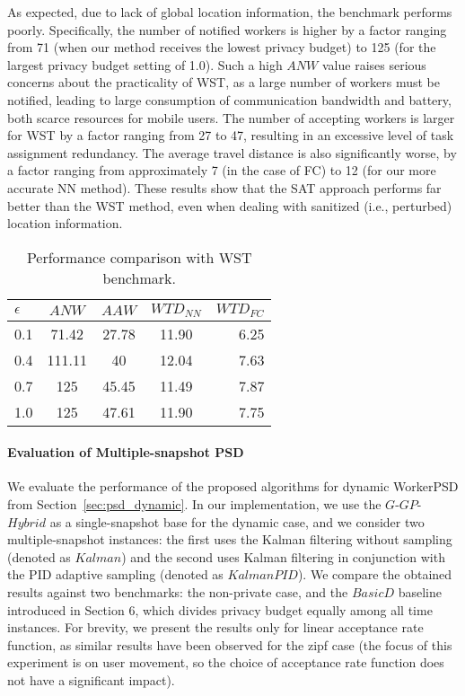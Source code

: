 \documentclass{USC-Thesis}
\newcommand{\tn}{\tabularnewline}
\numberwithin{equation}{chapter}
\begin{document}
As expected, due to lack of global location information, the benchmark performs poorly. Specifically, the number of notified workers is higher by a factor ranging from 71 (when our method receives the lowest privacy budget) to 125 (for the largest privacy budget setting of 1.0). Such a high $ANW$ value raises serious concerns about the practicality of WST, as a large number of workers must be notified, leading to large consumption of communication bandwidth and battery, both scarce resources for mobile users. The number of accepting workers is larger for WST by a factor ranging from 27 to 47, resulting in an excessive level of task assignment redundancy. The average travel distance is also significantly worse, by a factor ranging from approximately 7 (in the case of FC) to 12 (for our more accurate NN method). These results show that the SAT approach performs far better than the WST method, even when dealing with sanitized (i.e., perturbed) location information.

\begin{table}[ht]
\begin{center}
\footnotesize
\begin{tabular}{ l | c | c | c | r}
\textbf{$\epsilon$} & \textbf{$\mathit{ANW}$} & \textbf{$\mathit{AAW}$} & \textbf{$\mathit{WTD_{NN}}$} & \textbf{$\mathit{WTD_{FC}}$} \tn
\hline
0.1 & 71.42 & 27.78 & 11.90 & 6.25 \tn
\hline
0.4 & 111.11 & 40 & 12.04 & 7.63 \tn
\hline
0.7 & 125 & 45.45 & 11.49 & 7.87 \tn
\hline
1.0 & 125 & 47.61 & 11.90 & 7.75 \tn
\end{tabular}
\caption{Performance comparison with WST benchmark.}
\label{tab:privacy_wst}
\end{center}
\end{table}


\paragraph{Evaluation of Multiple-snapshot PSD}
\label{sec:results2}

We evaluate the performance of the proposed algorithms for dynamic WorkerPSD from Section~\ref{sec:psd_dynamic}. In our implementation, we use the $G$-$\mathit{GP}$-$\mathit{Hybrid}$ as a single-snapshot base for the dynamic case, and we consider two multiple-snapshot instances: the first uses the Kalman filtering without sampling (denoted as $\mathit{Kalman}$) and the second uses Kalman filtering in conjunction with the PID adaptive sampling (denoted as $\mathit{KalmanPID}$).
We compare the obtained results against two benchmarks: the non-private case, and the $\mathit{BasicD}$ baseline introduced in Section 6, which divides privacy budget equally among all time instances. For brevity, we present the results only for linear acceptance rate function, as similar results have been observed for the zipf case (the focus of this experiment is on user movement, so the choice of acceptance rate function does not have a significant impact).
\end{document}
